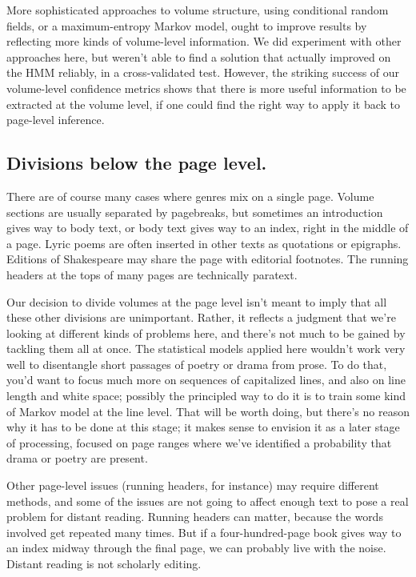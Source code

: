 \documentclass[paper=a4, fontsize=12pt]{scrartcl}
\numberwithin{equation}{section}		%
\numberwithin{figure}{section}			%
\numberwithin{table}{section}				%
\begin{document}
More sophisticated approaches to volume structure, using conditional random fields, or a maximum-entropy Markov model, ought to improve results by reflecting more kinds of volume-level information. We did experiment with other approaches here, but weren't able to find a solution that actually improved on the HMM reliably, in a cross-validated test. However, the striking success of our volume-level confidence metrics shows that there is more useful information to be extracted at the volume level, if one could find the right way to apply it back to page-level inference.

\subsection{Divisions below the page level.}

There are of course many cases where genres mix on a single page. Volume sections are usually separated by pagebreaks, but sometimes an introduction gives way to body text, or body text gives way to an index, right in the middle of a page. Lyric poems are often inserted in other texts as quotations or epigraphs. Editions of Shakespeare may share the page with editorial footnotes. The running headers at the tops of many pages are technically paratext.

Our decision to divide volumes at the page level isn't meant to imply that all these other divisions are unimportant. Rather, it reflects a judgment that we're looking at different kinds of problems here, and there's not much to be gained by tackling them all at once. The statistical models applied here wouldn't work very well to disentangle short passages of poetry or drama from prose. To do that, you'd want to focus much more on sequences of capitalized lines, and also on line length and white space; possibly the principled way to do it is to train some kind of Markov model at the line level. That will be worth doing, but there's no reason why it has to be done at this stage; it makes sense to envision it as a later stage of processing, focused on page ranges where we've identified a probability that drama or poetry are present.

Other page-level issues (running headers, for instance) may require different methods, and some of the issues are not going to affect enough text to pose a real problem for distant reading. Running headers can matter, because the words involved get repeated many times. But if a four-hundred-page book gives way to an index midway through the final page, we can probably live with the noise. Distant reading is not scholarly editing.
\end{document}
